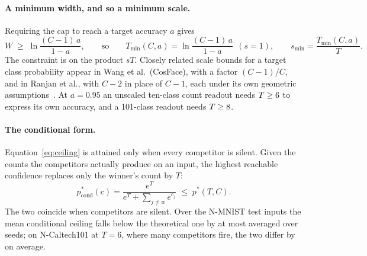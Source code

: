 \documentclass[10pt]{article}
\begin{document}
\paragraph{A minimum width, and so a minimum scale.}
Requiring the cap to reach a target accuracy $a$ gives
\begin{equation}
\label{eq:tmin}
W \;\ge\; \ln\frac{(C-1)\,a}{1-a}, \qquad\text{so}\qquad
T_{\min}(C,a) = \ln\frac{(C-1)\,a}{1-a}\ \ (s=1), \qquad s_{\min} = \frac{T_{\min}(C,a)}{T}.
\end{equation}
The constraint is on the product $sT$. Closely related scale bounds for a target class
probability appear in Wang et al.\ (CosFace), with a factor $(C-1)/C$, and in Ranjan et al., with $C-2$ in
place of $C-1$, each under its own geometric assumptions~\citep{wang2018cosface,ranjan2017l2}. %
At $a=0.95$ an unscaled ten-class count readout needs $T\ge6$ to express its own %
accuracy, and a 101-class readout needs $T\ge8$. %

\paragraph{The conditional form.}
Equation~\eqref{eq:ceiling} is attained only when every competitor is silent. Given the counts the
competitors actually produce on an input, the highest reachable confidence replaces only the
winner's count by $T$:
\begin{equation}
p^{*}_{\mathrm{cond}}(c) = \frac{e^{T}}{e^{T}+\sum_{j\ne w} e^{c_j}} \;\le\; p^{*}(T,C).
\end{equation}
The two coincide when competitors are silent. Over the N-MNIST test inputs the mean conditional
ceiling falls below the theoretical one by at most \condGapTenMax{} averaged over seeds; on %
N-Caltech101 at $T=6$, where many competitors fire, the two differ by \condGapHundredOneSix{} on %
average.
\end{document}

